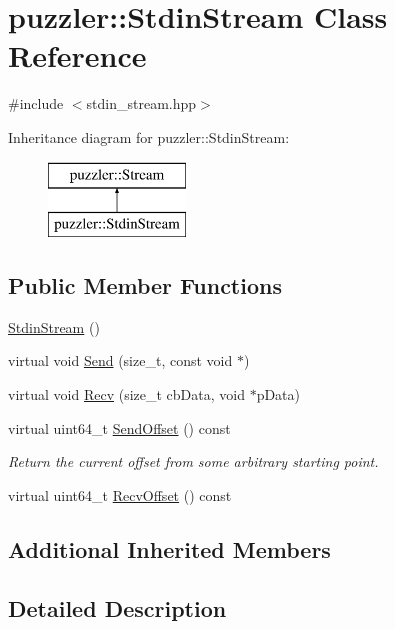 \hypertarget{a00029}{}\section{puzzler\+:\+:Stdin\+Stream Class Reference}
\label{a00029}


{\ttfamily \#include $<$stdin\+\_\+stream.\+hpp$>$}

Inheritance diagram for puzzler\+:\+:Stdin\+Stream\+:\begin{figure}[H]
\begin{center}
\leavevmode
\includegraphics[height=2.000000cm]{a00029}
\end{center}
\end{figure}
\subsection*{Public Member Functions}
\begin{DoxyCompactItemize}
\item 
\hyperlink{a00029_a5e146ddcb6699098253f81a6563a0918}{Stdin\+Stream} ()
\item 
virtual void \hyperlink{a00029_a14735ec3cb2d1d5fd461e88270216c13}{Send} (size\+\_\+t, const void $\ast$)
\item 
virtual void \hyperlink{a00029_a1fc5817613feb455300176f2c1c01796}{Recv} (size\+\_\+t cb\+Data, void $\ast$p\+Data)
\item 
virtual uint64\+\_\+t \hyperlink{a00029_ac56d6e48e8f0271afd00732b7763e0e2}{Send\+Offset} () const 
\begin{DoxyCompactList}\small\item\em Return the current offset from some arbitrary starting point. \end{DoxyCompactList}\item 
virtual uint64\+\_\+t \hyperlink{a00029_aea1804e01face82dac1313265167c91b}{Recv\+Offset} () const 
\end{DoxyCompactItemize}
\subsection*{Additional Inherited Members}


\subsection{Detailed Description}


